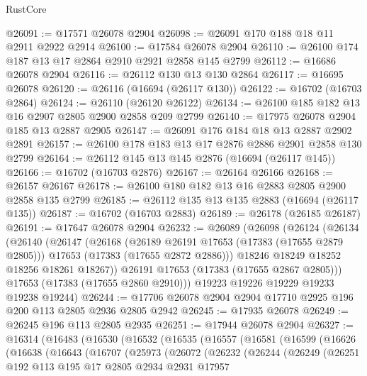 \begin{lexlean}{RustCore}
\begin{coremodule}
@26091 := @17571 @26078 @2904
@26098 := @26091 @170 @188 @18 @11 @2911 @2922 @2914
@26100 := @17584 @26078 @2904
@26110 := @26100 @174 @187 @13 @17 @2864 @2910 @2921 @2858 @145 @2799
@26112 := @16686 @26078 @2904
@26116 := @26112 @130 @13 @130 @2864
@26117 := @16695 @26078
@26120 := @26116 (@16694 (@26117 @130))
@26122 := @16702 (@16703 @2864)
@26124 := @26110 (@26120 @26122)
@26134 := @26100 @185 @182 @13 @16 @2907 @2805 @2900 @2858 @209 @2799
@26140 := @17975 @26078 @2904 @185 @13 @2887 @2905
@26147 := @26091 @176 @184 @18 @13 @2887 @2902 @2891
@26157 := @26100 @178 @183 @13 @17 @2876 @2886 @2901 @2858 @130 @2799
@26164 := @26112 @145 @13 @145 @2876 (@16694 (@26117 @145))
@26166 := @16702 (@16703 @2876)
@26167 := @26164 @26166
@26168 := @26157 @26167
@26178 := @26100 @180 @182 @13 @16 @2883 @2805 @2900 @2858 @135 @2799
@26185 := @26112 @135 @13 @135 @2883 (@16694 (@26117 @135))
@26187 := @16702 (@16703 @2883)
@26189 := @26178 (@26185 @26187)
@26191 := @17647 @26078 @2904
@26232 := @26089
    (@26098
      (@26124
        (@26134
          (@26140
            (@26147
              (@26168
                (@26189 @26191 @17653 (@17383 (@17655 @2879 @2805)))
                @17653
                (@17383 (@17655 @2872 @2886)))
              @18246
              @18249
              @18252
              @18256
              @18261
              @18267))
          @26191
          @17653
          (@17383 (@17655 @2867 @2805)))
        @17653
        (@17383 (@17655 @2860 @2910)))
      @19223
      @19226
      @19229
      @19233
      @19238
      @19244)
@26244 := @17706 @26078 @2904 @2904 @17710 @2925 @196 @200 @113 @2805 @2936 @2805 @2942
@26245 := @17935 @26078
@26249 := @26245 @196 @113 @2805 @2935
@26251 := @17944 @26078 @2904
@26327 := @16314
    (@16483
      (@16530
        (@16532
          (@16535
            (@16557
              (@16581
                (@16599
                  (@16626
                    (@16638
                      (@16643
                        (@16707
                          (@25973
                            (@26072
                              (@26232
                                (@26244
                                  (@26249
                                    (@26251
                                      @192
                                      @113
                                      @195
                                      @17
                                      @2805
                                      @2934
                                      @2931
                                      @17957

\end{coremodule}
\end{lexlean}
